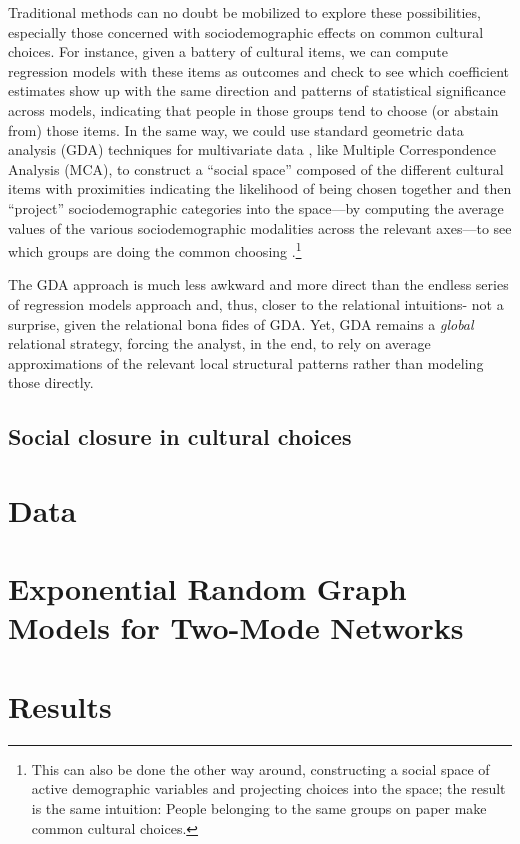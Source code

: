 \documentclass[preprint,12pt,authoryear]{elsarticle}
\begin{document}
Traditional methods can no doubt be mobilized to explore these possibilities, especially those concerned with sociodemographic effects on common cultural choices. For instance, given a battery of cultural items, we can compute regression models with these items as outcomes and check to see which coefficient estimates show up with the same direction and patterns of statistical significance across models, indicating that people in those groups tend to choose (or abstain from) those items. In the same way, we could use standard geometric data analysis (GDA) techniques for multivariate data \citep{le2004geometric}, like Multiple Correspondence Analysis (MCA), to construct a ``social space'' composed of the different cultural items with proximities indicating the likelihood of being chosen together and then ``project'' sociodemographic categories into the space---by computing the average values of the various sociodemographic modalities across the relevant axes---to see which groups are doing the common choosing \citep{flemmen2018social, le2008class}.\footnote{This can also be done the other way around, constructing a social space of active demographic variables and projecting choices into the space; the result is the same intuition: People belonging to the same groups on paper make common cultural choices.} 

The GDA approach is much less awkward and more direct than the endless series of regression models approach and, thus, closer to the relational intuitions- not a surprise, given the relational bona fides of GDA. Yet, GDA remains a \textit{global} relational strategy, forcing the analyst, in the end, to rely on average approximations of the relevant local structural patterns rather than modeling those directly. 

\subsection{Social closure in cultural choices}

\section{Data}
\label{sec:data}
\section{Exponential Random Graph Models for Two-Mode Networks}
\label{sec:ermgs}
\section{Results}
\label{sec:results}
\end{document}
